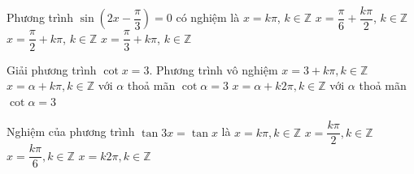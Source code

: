 \begin{ex}%
	Phương trình $\sin \left( 2x - \dfrac{\pi}{3} \right) = 0$ có nghiệm  là
	 \choice
		{$x  = k\pi$, $k \in \mathbb{Z}$}
		{\True  $x = \dfrac{\pi}{6} + \dfrac{k\pi}{2}$, $k \in \mathbb{Z}$}
		 {$x = \dfrac{\pi}{2} + k\pi$, $k \in \mathbb{Z}$}
		{$x = \dfrac{\pi}{3} + k\pi$,  $k \in \mathbb{Z}$}
\end{ex}

\begin{ex}%
	Giải phương trình $\cot x=3$. 
	 \choice
		{Phương  trình vô nghiệm}
		{$x=3+k\pi, k\in  \mathbb{Z}$}
		{\True  $x=\alpha+k\pi, k\in \mathbb{Z}$ với $\alpha$ thoả mãn $\cot \alpha=3$}
		{$x=\alpha+k2\pi, k\in \mathbb{Z}$  với $\alpha$ thoả mãn $\cot \alpha=3$}
\end{ex}

\begin{ex}%
	Nghiệm của phương  trình $\tan 3x=\tan x$ là
	\choice 
		{\True $x=k\pi, k\in\mathbb{Z}$} 
		 {$x=\dfrac{k\pi}{2}, k\in\mathbb{Z}$}
		{$x=\dfrac{k\pi}{6},  k\in\mathbb{Z}$}
		{$x=k2\pi, k\in\mathbb{Z}$} 
\end{ex}

